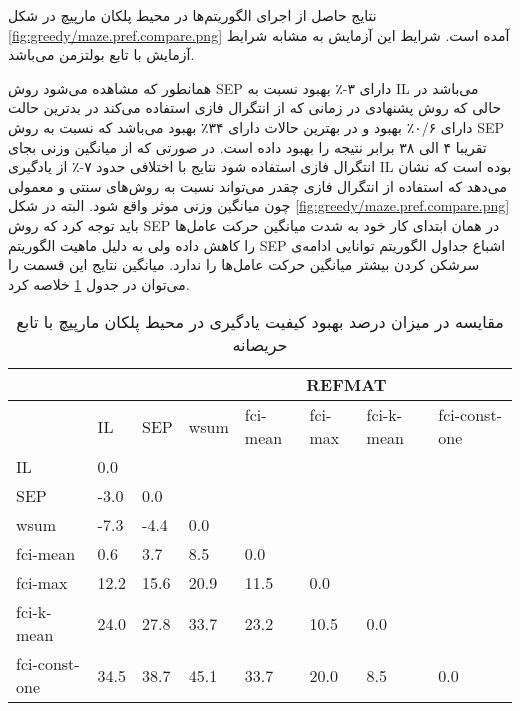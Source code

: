  نتایج حاصل از اجرای الگوریتم‌ها در محیط پلکان مارپیچ در شکل
\ref{fig:greedy/maze.pref.compare.png}
آمده است. شرایط این آزمایش به مشابه شرایط آزمایش با تابع بولتزمن می‌باشد.


همانطور که مشاهده می‌شود روش SEP دارای ۳-٪ بهبود نسبت به IL می‌باشد در حالی که روش پشنهادی در زمانی که از انتگرال فازی استفاده می‌کند در بدترین حالت دارای ۰/۶٪ بهبود و در بهترین حالات دارای ۳۴٪ بهبود می‌باشد که نسبت به روش SEP تقریبا ۴ الی ۳۸ برابر نتیجه را بهبود داده است. در صورتی که از میانگین وزنی بجای انتگرال فازی استفاده شود نتایج با اختلافی حدود ۷-٪  از یادگیری IL بوده است که نشان ‌می‌دهد که استفاده از انتگرال فازی چقدر می‌تواند نسبت به روش‌های سنتی و معمولی چون میانگین وزنی موثر واقع شود. البته در شکل \ref{fig:greedy/maze.pref.compare.png} باید توجه کرد که روش SEP در همان ابتدای کار خود به شدت میانگین حرکت عامل‌ها را کاهش داده ولی به دلیل ماهیت الگوریتم SEP اشباع جداول الگوریتم توانایی ادامه‌ی سرشکن کردن بیشتر میانگین حرکت عامل‌ها را ندارد. میانگین نتایج این قسمت را می‌توان در جدول
\ref{tab:maze_pref_compare_greedy}
خلاصه کرد.

\begin{table}
\centering
\caption{مقایسه در میزان درصد بهبود کیفیت یادگیری در محیط پلکان مارپیچ با تابع حریصانه}\label{tab:maze_pref_compare_greedy}
\begin{latin}
\begin{tabular}{|*8{l|}}
\hline
\multicolumn{3}{|c|}{}& \multicolumn{5}{c|}{REFMAT}
\\\hline
& IL & SEP & wsum & fci-mean & fci-max & fci-k-mean & fci-const-one
\\\hline
IL &0.0 & & & & & &
\\\hline
SEP &-3.0 &0.0 & & & & &
\\\hline
wsum &-7.3 &-4.4 &0.0 & & & &
\\\hline
fci-mean &0.6 &3.7 &8.5 &0.0 & & &
\\\hline
fci-max &12.2 &15.6 &20.9 &11.5 &0.0 & &
\\\hline
fci-k-mean &24.0 &27.8 &33.7 &23.2 &10.5 &0.0 &
\\\hline
fci-const-one &34.5 &38.7 &45.1 &33.7 &20.0 &8.5 &0.0
\\\hline
\end{tabular}
\end{latin}
\end{table}

